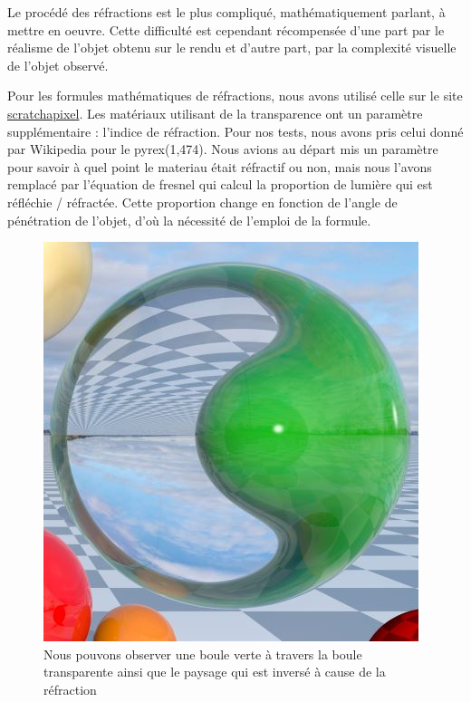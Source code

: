 Le procédé des réfractions est le plus compliqué, mathématiquement parlant, à mettre en oeuvre. Cette difficulté est cependant récompensée d'une part par le réalisme de l'objet obtenu sur le rendu et d'autre part, par la complexité visuelle de l'objet observé.

Pour les formules mathématiques de réfractions, nous avons utilisé celle sur le site \href{https://www.scratchapixel.com/lessons/3d-basic-rendering/introduction-to-shading/reflection-refraction-fresnel}{scratchapixel}.
Les matériaux utilisant de la transparence ont un paramètre supplémentaire : l'indice de réfraction. Pour nos tests, nous avons pris celui donné par Wikipedia pour le pyrex(1,474). Nous avions au départ mis un paramètre pour savoir à quel point le materiau était réfractif ou non, mais nous l'avons remplacé par l'équation de fresnel qui calcul la proportion de lumière qui est réfléchie / réfractée. Cette proportion change en fonction de l'angle de pénétration de l'objet, d'où la nécessité de l'emploi de la formule.

\begin{figure}[h]
   \begin{center}
       \includegraphics[scale=0.8]{img/rt/refractions.jpg}
   \end{center}
   \caption{Nous pouvons observer une boule verte à travers la boule transparente ainsi que le paysage qui est inversé à cause de la réfraction}
\end{figure}
\FloatBarrier
